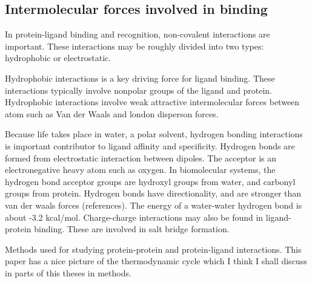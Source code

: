 \subsection{Intermolecular forces involved in binding}

% 
% 
% 
% 
% 
% 


In protein-ligand binding and recognition, non-covalent interactions are important.  These interactions may be roughly divided into two types: hydrophobic or electrostatic.  

Hydrophobic interactions is a key driving force for ligand binding.  These interactions typically involve nonpolar groups of the ligand and protein. Hydrophobic interactions involve weak attractive intermolecular forces between atom such as Van der Waals and london disperson forces. %

Because life takes place in water, a polar solvent, hydrogen bonding interactions is important contributor to ligand affinity and specificity.  Hydrogen bonds are formed from electrostatic interaction between dipoles.  The acceptor is an electronegative heavy atom such as oxygen. In biomolecular systems, the hydrogen bond acceptor groups are hydroxyl groups from water, and carbonyl groups from protein. Hydrogen bonds have directionality, and are stronger than van der waals forces (references).  The energy of a water-water hydrogen bond is about -3.2 kcal/mol. Charge-charge interactions may also be found in ligand-protein binding.  These are involved in salt bridge formation.


Methods used for studying protein-protein and protein-ligand interactions.\cite{Wang:2001ez}
This paper\cite{Durrant:2011bm} has a nice picture of the thermodynamic cycle which I think I shall discuss in parts of this theses in methods.

